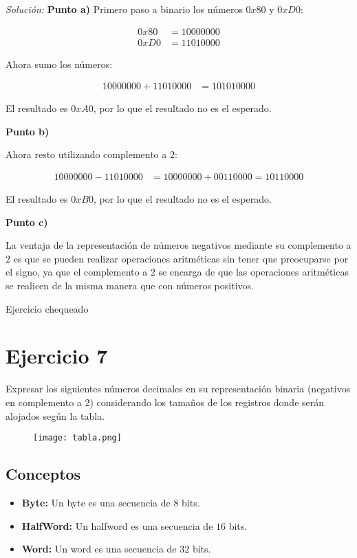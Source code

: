 \documentclass{article}
\newenvironment{solution}
    {\textit{Solución:}}
    {}
\begin{document}
\begin{solution}
\textbf{Punto a)}
Primero paso a binario los números $0x80$ y $0xD0$:

\begin{align*}
    0x80 &= 10000000\\
    0xD0 &= 11010000
\end{align*}

Ahora sumo los números:

\begin{align*}
    10000000 + 11010000 &= 101010000
\end{align*}

El resultado es $0xA0$, por lo que el resultado no es el esperado.

\textbf{Punto b)}

Ahora resto utilizando complemento a $2$:

\begin{align*}
    10000000 - 11010000 &= 10000000 + 00110000 = 10110000
\end{align*}

El resultado es $0xB0$, por lo que el resultado no es el esperado.

\textbf{Punto c)}

La ventaja de la representación de números negativos mediante su complemento a $2$ es que se pueden realizar operaciones aritméticas sin tener que preocuparse por el signo, ya que el complemento a $2$ se encarga de que las operaciones aritméticas se realicen de la misma manera que con números positivos.

\end{solution}

{\color{green} Ejercicio chequeado}

\newpage

\section*{Ejercicio 7}
Expresar los siguientes números decimales en su representación binaria (negativos en complemento a 2) considerando los tamaños de los registros donde serán alojados según la tabla.

\begin{figure}[h]
    \texttt{[image: tabla.png]}
\end{figure}

\subsection*{Conceptos}
\begin{itemize}
    \item \textbf{Byte:} Un byte es una secuencia de $8$ bits.
    \item \textbf{HalfWord:} Un halfword es una secuencia de $16$ bits.
    \item \textbf{Word:} Un word es una secuencia de $32$ bits.
\end{itemize}
\end{document}
